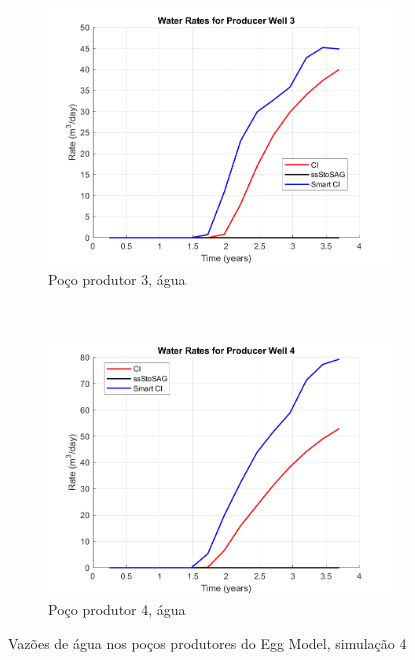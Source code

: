 \begin{figure}[!ht]
	\begin{subfigure}[b]{.3\textwidth}
		\includegraphics[width=\textwidth]{figs/resultadosEgg/imgsim4/EGG_WaterWell3_Zoom}
		\caption{Po\c{c}o produtor 3, \'{a}gua}
		\label{EGG4_WaterWell3}
	\end{subfigure}
	~
	\begin{subfigure}[b]{.3\textwidth}
		\includegraphics[width=\textwidth]{figs/resultadosEgg/imgsim4/EGG_WaterWell4_Zoom}
		\caption{Po\c{c}o produtor 4, \'{a}gua}
		\label{EGG4_WaterWell4}
	\end{subfigure}
	\caption{Vaz\~{o}es de \'{a}gua nos po\c{c}os produtores do Egg Model, simula\c{c}\~{a}o 4}
	\label{EGG4_WaterRates}
\end{figure}

